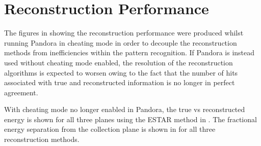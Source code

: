 \chapter{Reconstruction Performance}
\label{app:reconstruction_performance}

The figures in  showing the reconstruction performance were produced whilst running Pandora in cheating mode in order to decouple the reconstruction methods from inefficiencies within the pattern recognition. If Pandora is instead used without cheating mode enabled, the resolution of the reconstruction algorithms is expected to worsen owing to the fact that the number of hits associated with true and reconstructed information is no longer in perfect agreement. 

With cheating mode no longer enabled in Pandora, the true vs reconstructed energy is shown for all three planes using the ESTAR method in . The fractional energy separation from the collection plane is shown in  for all three reconstruction methods.

